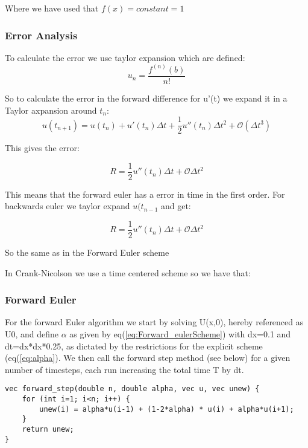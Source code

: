 \documentclass[a4paper,10pt]{article}
\begin{document}
 Where we have used that $f(x) = constant = 1$

\subsubsection{Error Analysis}
To calculate the error we use taylor expansion which are defined:
\begin{equation}
 u_n = \frac{f^{(n)}(b)}{n!}
\end{equation}

So to calculate the error in the forward difference for u'(t) we expand it in a Taylor axpansion around $t_n$:
\begin{equation}
 u(t_{n+1}) = u(t_n) + u'(t_n)\Delta t + \frac{1}{2}u''(t_n)\Delta t^2 + \mathcal{O}(\Delta t^3)
\end{equation}

This gives the error:

\begin{equation}
 R = \frac{1}{2}u''(t_n)\Delta t + \mathcal{O}\Delta t^2
\end{equation}

This means that the forward euler has a error in time in the first order. 
For backwards euler we taylor expand $u(t_{n-1}$ and get:

\begin{equation}
  R = \frac{1}{2}u''(t_n)\Delta t + \mathcal{O}\Delta t^2
\end{equation}

So the same as in the Forward Euler scheme

In Crank-Nicolson we use a time centered scheme so we have that:
\begin{equation}
 
\end{equation}


\subsubsection{Forward Euler}
For the forward Euler algorithm we start by solving U(x,0), hereby referenced as U0, and define $\alpha$ as given by eq(\ref{eq:Forward_eulerScheme}) with dx=0.1 and dt=dx*dx*0.25, as dictated by the
restrictions for the explicit scheme (eq(\ref{eq:alpha}). We then call the forward step method (see below) for a given number of timesteps, each run increasing the total time T by dt.
\begin{verbatim}
vec forward_step(double n, double alpha, vec u, vec unew) {
    for (int i=1; i<n; i++) {
        unew(i) = alpha*u(i-1) + (1-2*alpha) * u(i) + alpha*u(i+1);
    }
    return unew;
} 
\end{verbatim}
\end{document}
